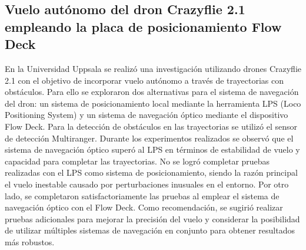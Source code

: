 \subsection*{Vuelo autónomo del dron Crazyflie 2.1 empleando la placa de posicionamiento Flow Deck}
En la Universidad Uppsala \cite{Chadehumbe2020_tesis} se realizó una investigación utilizando drones Crazyflie 2.1 con el objetivo de incorporar vuelo autónomo a través de trayectorias con obstáculos. Para ello se exploraron dos alternativas para el sistema de navegación del dron: un sistema de posicionamiento local mediante la herramienta LPS (Loco Positioning System) y un sistema de navegación óptico mediante el dispositivo Flow Deck. Para la detección de obstáculos en las trayectorias se utilizó el sensor de detección Multiranger. Durante los experimentos realizados se observó que el sistema de navegación óptico superó al LPS en términos de estabilidad de vuelo y capacidad para completar las trayectorias. No se logró completar pruebas realizadas con el LPS como sistema de posicionamiento, siendo la razón principal el vuelo inestable causado por perturbaciones inusuales en el entorno. Por otro lado, se completaron satisfactoriamente las pruebas al emplear el sistema de navegación óptico con el Flow Deck. Como recomendación, se sugirió realizar pruebas adicionales para mejorar la precisión del vuelo y considerar la posibilidad de utilizar múltiples sistemas de navegación en conjunto para obtener resultados más robustos.